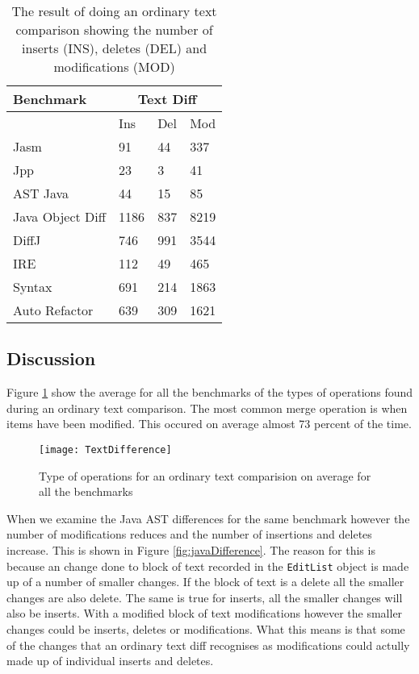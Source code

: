 \begin{table}[H]
    \centering
    \begin{tabular}{l|lll}
    Benchmark        & \multicolumn{3}{|c}{Text Diff} \\ \hline
    ~                & Ins            & Del & Mod  \\ \hline
    Jasm             & 91             & 44  & 337  \\
    Jpp              & 23             & 3   & 41   \\
    AST Java         & 44             & 15  & 85   \\
    Java Object Diff & 1186           & 837 & 8219 \\
    DiffJ            & 746            & 991 & 3544 \\
    IRE              & 112            & 49  & 465  \\
    Syntax           & 691            & 214 & 1863 \\
    Auto Refactor    & 639            & 309 & 1621 \\
    \end{tabular}
    \caption{The result of doing an ordinary text comparison showing the number of inserts (INS), deletes (DEL) and modifications (MOD)}
    \label{tab:textcomp}
\end{table}



\subsection{Discussion}
Figure \ref{fig:textDifference} show the average for all the benchmarks of the types of operations found during an ordinary text comparison.  
The most common merge operation is when items have been modified.  
This occured on average  almost 73 percent of the time.

\begin{figure}[!t]
 \begin{center}
 \texttt{[image: TextDifference]}
 \end{center}
 \caption{Type of operations for an ordinary text comparision on average for all the benchmarks}
 \label{fig:textDifference}
\end{figure}

When we examine the Java AST differences for the same benchmark however the number of modifications reduces and the number of insertions and deletes increase.
This is shown in Figure \ref{fig:javaDifference}.
The reason for this is because an change done to block of text recorded in the \lstinline{EditList} object is made up of a number of smaller changes.  
If the block of text is a delete all the smaller changes are also delete.  
The same is true for inserts, all the smaller changes will also be inserts.
With a modified block of text modifications however the smaller changes could be inserts, deletes or modifications.
What this means is that some of the changes that an ordinary text diff recognises as modifications could actully made up of individual inserts and deletes. 

